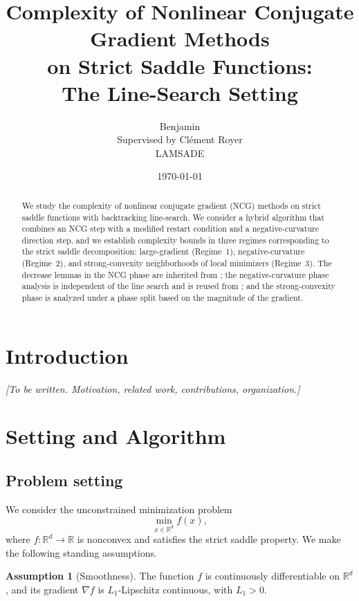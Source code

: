 \documentclass[11pt,a4paper]{article}
\title{Complexity of Nonlinear Conjugate Gradient Methods\\
on Strict Saddle Functions:\\
The Line-Search Setting}
\author{Benjamin \\ \small Supervised by Cl\'ement Royer \\ \small LAMSADE}
\date{\today}
\theoremstyle{plain}
\theoremstyle{definition}
\newtheorem{assumption}{Assumption}
\newcommand{\R}{\mathbb{R}}
\newcommand{\grad}{\nabla}
\newcommand{\Lone}{L_{1}}
\begin{document}
\maketitle

\begin{abstract}
We study the complexity of nonlinear conjugate gradient (NCG) methods on strict saddle functions with backtracking line-search. 
We consider a hybrid algorithm that combines an NCG step with a modified restart condition and a negative-curvature direction step, 
and we establish complexity bounds in three regimes corresponding to the strict saddle decomposition: large-gradient (Regime~1), negative-curvature (Regime~2), 
and strong-convexity neighborhoods of local minimizers (Regime~3). The decrease lemmas in the NCG phase are inherited from \cite{RoyerChan2022}; 
the negative-curvature phase analysis is independent of the line search and is reused from \cite{WrightMa2022}; 
and the strong-convexity phase is analyzed under a phase split based on the magnitude of the gradient.
\end{abstract}

\tableofcontents

\section{Introduction}\label{sec:intro}

\textit{[To be written. Motivation, related work, contributions, organization.]}

\section{Setting and Algorithm}\label{sec:setting}


\subsection{Problem setting}\label{subsec:problem}

We consider the unconstrained minimization problem
\begin{equation}\label{eq:problem}
\min_{x \in \R^{d}} f(x),
\end{equation}
where $f \colon \R^{d} \to \R$ is nonconvex and satisfies the strict saddle property. We make the following standing assumptions.

\begin{assumption}[Smoothness]\label{ass:smooth}
The function $f$ is continuously differentiable on $\R^{d}$, and its gradient $\grad f$ is $\Lone$-Lipschitz continuous, with $\Lone > 0$.
\end{assumption}
\end{document}
